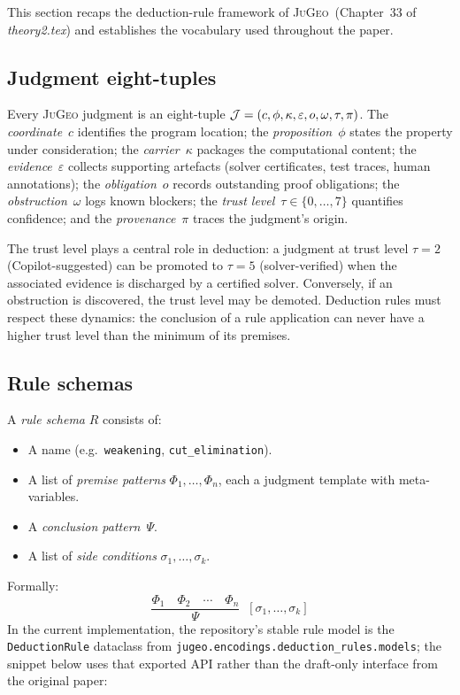 \documentclass[11pt]{article}
\newcommand{\JG}{\textsc{JuGeo}}
\begin{document}
This section recaps the deduction-rule framework of
\JG{}~(Chapter~33 of \emph{theory2.tex}) and establishes the
vocabulary used throughout the paper.

\subsection{Judgment eight-tuples}\label{ssec:judgments}

Every \JG{} judgment is an eight-tuple
$\mathcal{J} = (c,\phi,\kappa,\varepsilon,o,\omega,\tau,\pi)$.
The \emph{coordinate}~$c$ identifies the program location; the
\emph{proposition}~$\phi$ states the property under consideration;
the \emph{carrier}~$\kappa$ packages the computational content;
the \emph{evidence}~$\varepsilon$ collects supporting artefacts
(solver certificates, test traces, human annotations); the
\emph{obligation}~$o$ records outstanding proof obligations; the
\emph{obstruction}~$\omega$ logs known blockers; the \emph{trust
level}~$\tau \in \{0,\ldots,7\}$ quantifies confidence; and the
\emph{provenance}~$\pi$ traces the judgment's origin.

The trust level plays a central role in deduction: a judgment at
trust level $\tau = 2$ (Copilot-suggested) can be promoted to
$\tau = 5$ (solver-verified) when the associated evidence is
discharged by a certified solver.  Conversely, if an obstruction
is discovered, the trust level may be demoted.  Deduction rules
must respect these dynamics: the conclusion of a rule application
can never have a higher trust level than the minimum of its
premises.

\subsection{Rule schemas}\label{ssec:rule-schemas}

A \emph{rule schema} $R$ consists of:
\begin{itemize}
  \item A name (e.g.\ \texttt{weakening}, \texttt{cut\_elimination}).
  \item A list of \emph{premise patterns} $\Phi_1, \ldots, \Phi_n$,
    each a judgment template with meta-variables.
  \item A \emph{conclusion pattern}~$\Psi$.
  \item A list of \emph{side conditions} $\sigma_1, \ldots, \sigma_k$.
\end{itemize}
Formally:
\[
  \frac{\Phi_1 \quad \Phi_2 \quad \cdots \quad \Phi_n}{\Psi}
  \;\;[\sigma_1, \ldots, \sigma_k]
\]
In the current implementation, the repository's stable rule model is
the \texttt{DeductionRule} dataclass from
\texttt{jugeo.encodings.deduction\_rules.models}; the snippet below uses
that exported API rather than the draft-only interface from the
original paper:
\end{document}
